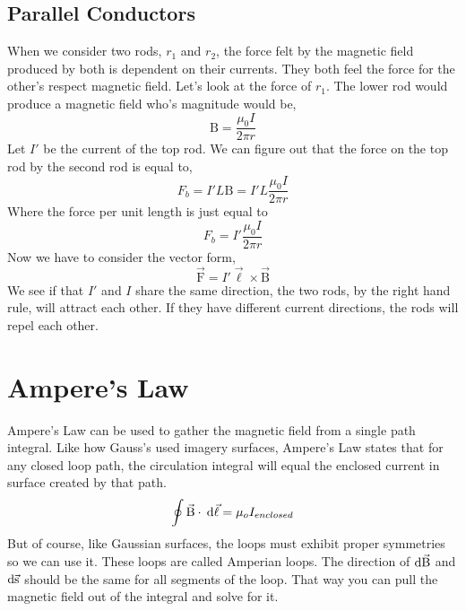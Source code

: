 \subsection{Parallel Conductors}
When we consider two rods, $r_1$ and $r_2$, the force felt by the magnetic field produced by both is dependent on their currents. They both feel the force for the other's respect magnetic field. Let's look at the force of $r_1$. The lower rod would produce a magnetic field who's magnitude would be, 
\begin{equation*}
	\mathrm{B}= \frac{\mu_0I}{2\pi r} 
\end{equation*}
Let $I'$ be the current of the top rod. We can figure out that the force on the top rod by the second rod is equal to,
\begin{equation*}
	F_b = I'L\mathrm{B} = I'L \frac{\mu_0I}{2\pi r} 
\end{equation*}
Where the force per unit length is just equal to 
\begin{equation*}
	F_b = I'\frac{\mu_0I}{2\pi r} 
\end{equation*}
Now we have to consider the vector form, 
\begin{equation*}
	\vec{\mathrm{F}} = I'\vec{\ell} \times \vec{\mathrm{B}}
\end{equation*}
We see if that $I'$ and $I$ share the same direction, the two rods, by the right hand rule, will attract each other. If they have different current directions, the rods will repel each other.
\section{Ampere's Law}
Ampere's Law can be used to gather the magnetic field from a single path integral. Like how Gauss's used imagery surfaces, Ampere's Law states that for any closed loop path, the circulation integral will equal the enclosed current in surface created by that path. 
\begin{equation*}
	\oint \vec{\mathrm{B}} \cdot \: \mathrm{d}\vec{\ell} = \mu_oI_{enclosed}
\end{equation*}
But of course, like Gaussian surfaces, the loops must exhibit proper symmetries so we can use it. These loops are called Amperian loops. The direction of $\mathrm{d}\vec{\mathrm{B}}$ and $\mathrm{d}\vec{\mathrm{s}}$
should be the same for all segments of the loop. That way you can pull the magnetic field out of the integral and solve for it. 
